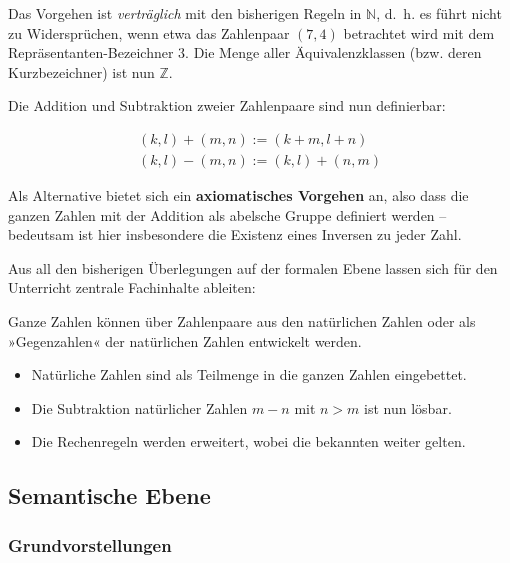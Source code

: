 \documentclass[
]{scrbook}
\providecommand{\tightlist}{%
  \setlength{\itemsep}{0pt}\setlength{\parskip}{0pt}}
\theoremstyle{definition}
\theoremstyle{definition}
\theoremstyle{definition}
\theoremstyle{definition}
\theoremstyle{remark}
\begin{document}
Das Vorgehen ist \emph{verträglich} mit den bisherigen Regeln in \(\mathbb{N}\), d.~h. es führt nicht zu Widersprüchen, wenn etwa das Zahlenpaar \((7,4)\) betrachtet wird mit dem Repräsentanten-Bezeichner \(3\). Die Menge aller Äquivalenzklassen (bzw. deren Kurzbezeichner) ist nun \(\mathbb{Z}\).

Die Addition und Subtraktion zweier Zahlenpaare sind nun definierbar:

\begin{align}
(k, l) + (m, n) := (k + m, l + n)\\
(k, l) − (m, n) := (k, l) + (n, m)
\end{align}

Als Alternative bietet sich ein \textbf{axiomatisches Vorgehen} an, also dass die ganzen Zahlen mit der Addition als abelsche Gruppe definiert werden -- bedeutsam ist hier insbesondere die Existenz eines Inversen zu jeder Zahl.

Aus all den bisherigen Überlegungen auf der formalen Ebene lassen sich für den Unterricht zentrale Fachinhalte ableiten:

\textcolor{formalColor}{Ganze Zahlen können über Zahlenpaare aus den natürlichen Zahlen oder als »Gegenzahlen« der natürlichen Zahlen entwickelt werden.}

\begin{itemize}
\tightlist
\item
  \textcolor{formalColor}{Natürliche Zahlen sind als Teilmenge in die ganzen Zahlen eingebettet.}\\
\item
  \textcolor{formalColor}{Die Subtraktion natürlicher Zahlen $m-n$ mit $n > m$ ist nun lösbar.}\\
\item
  \textcolor{formalColor}{Die Rechenregeln werden erweitert, wobei die bekannten weiter gelten.}
\end{itemize}

\hypertarget{ganze-zahlen-semantische-ebene}{%
\subsection{Semantische Ebene}\label{ganze-zahlen-semantische-ebene}}

\hypertarget{ganze-zahlen-grundvorstellungen}{%
\subsubsection{Grundvorstellungen}\label{ganze-zahlen-grundvorstellungen}}
\end{document}
